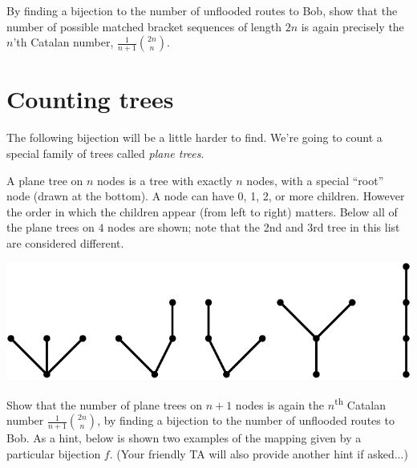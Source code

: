 \documentclass[12pt]{article}
\begin{document}
By finding a bijection to the number of unflooded routes to Bob, show that the number of possible matched bracket sequences of length $2n$ is again precisely the $n$'th Catalan number, $\frac{1}{n+1}{2n \choose n}$.

\newpage

\section*{Counting trees}

The following bijection will be a little harder to find. We're going to count a special family of trees called \emph{plane trees}.

A plane tree on $n$ nodes is a tree with exactly $n$ nodes, with a special ``root'' node (drawn at the bottom). A node can have 0, 1, 2, or more children. However the order in which the children appear (from left to right) matters. Below all of the plane trees on $4$ nodes are shown; note that the 2nd and 3rd tree in this list are considered different.

\begin{center}
    \includegraphics[scale=0.6]{Trees3}
\end{center}

Show that the number of plane trees on $n+1$ nodes is again the $n$\textsuperscript{th} Catalan number $\frac{1}{n+1}{2n \choose n}$, by 
finding a bijection to the number of unflooded routes to Bob. As a hint, below is shown two examples of the mapping given by a particular bijection $f$. (Your friendly TA will also provide another hint if asked...)
\end{document}
